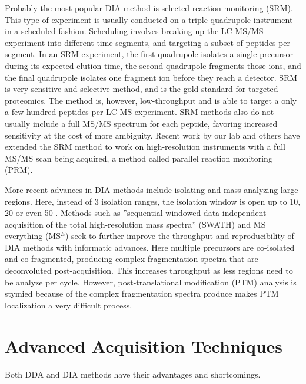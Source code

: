Probably the most popular DIA method is selected reaction monitoring (SRM).\cite{mrm1,mrm2,mrm3} This type of experiment is usually conducted on a triple-quadrupole instrument in a scheduled fashion. Scheduling involves breaking up the LC-MS/MS experiment into different time segments, and targeting a subset of peptides per segment. In an SRM experiment, the first quadrupole isolates a single precursor during its expected elution time, the second quadrupole fragments those ions, and the final quadrupole isolates one fragment ion before they reach a detector. SRM is very sensitive and selective method, and is the gold-standard for targeted proteomics. The method is, however, low-throughput and is able to target a only a few hundred peptides per LC-MS experiment.\cite{} SRM methods also do not usually include a full MS/MS spectrum for each peptide, favoring increased sensitivity at the cost of more ambiguity. Recent work by our lab and others have extended the SRM method to work on high-resolution instruments with a full MS/MS scan being acquired, a method called parallel reaction monitoring (PRM).\cite{prm1,prm2} 

More recent advances in DIA methods include isolating and mass analyzing large \mz{} regions. Here, instead of 3 \mz{} isolation ranges, the isolation window is open up to 10, 20 or even 50 \mz{}. Methods such as ''sequential windowed data independent acquisition of the total high-resolution mass spectra'' (SWATH) and MS everything (MS$^E$) seek to further improve the throughput and reproducibility of DIA methods with informatic advances.\cite{swath,mse} Here multiple precursors are co-isolated and co-fragmented, producing complex fragmentation spectra that are deconvoluted post-acquisition. This increases throughput as less \mz{} regions need to be analyze per cycle. However, post-translational modification (PTM) analysis is stymied because of the complex fragmentation spectra produce makes PTM localization a very difficult process.

\section{Advanced Acquisition Techniques}
Both DDA and DIA methods have their advantages and shortcomings. 

